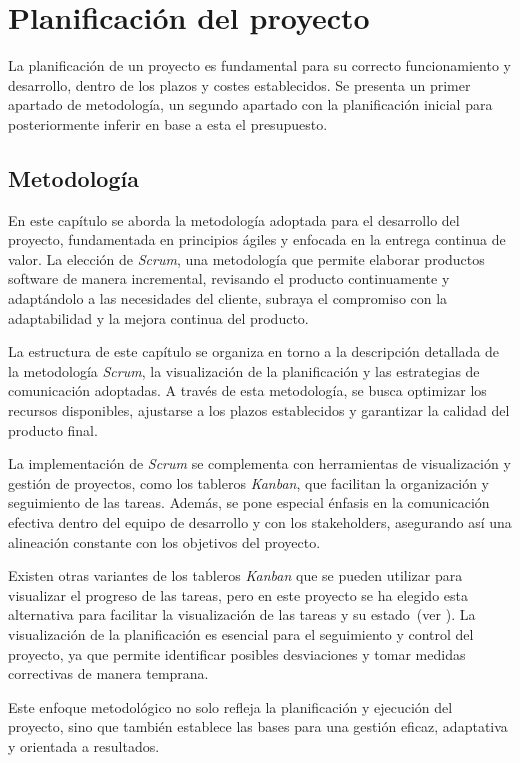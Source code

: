 \chapter{Planificación del proyecto}\label{chap:planif}
La planificación de un proyecto es fundamental para su correcto funcionamiento y
desarrollo, dentro de los plazos y costes establecidos. Se presenta un primer
apartado de metodología, un segundo apartado con la planificación inicial para
posteriormente inferir en base a esta el presupuesto.


\section{Metodología}\label{sec:metodología}
En este capítulo se aborda la metodología adoptada para el desarrollo del
proyecto, fundamentada en principios ágiles y enfocada en la entrega continua de
valor. La elección de \textit{Scrum}, una metodología que permite elaborar
productos software de manera incremental, revisando el producto continuamente y
adaptándolo a las necesidades del cliente, subraya el compromiso con la
adaptabilidad y la mejora continua del producto.

La estructura de este capítulo se organiza en torno a la descripción detallada
de la metodología \textit{Scrum}, la visualización de la planificación y las
estrategias de comunicación adoptadas. A través de esta metodología, se busca
optimizar los recursos disponibles, ajustarse a los plazos establecidos y
garantizar la calidad del producto final.

La implementación de \textit{Scrum} se complementa con herramientas de
visualización y gestión de proyectos, como los tableros \textit{Kanban}, que
facilitan la organización y seguimiento de las tareas. Además, se pone especial
énfasis en la comunicación efectiva dentro del equipo de desarrollo y con los
stakeholders, asegurando así una alineación constante con los objetivos del
proyecto.

Existen otras variantes de los tableros \textit{Kanban} que se pueden
utilizar para visualizar el progreso de las tareas, pero en este proyecto se ha
elegido esta alternativa para facilitar la visualización de las tareas y su
estado~(ver ). La visualización de la
planificación es esencial para el seguimiento y control del proyecto, ya que
permite identificar posibles desviaciones y tomar medidas correctivas de manera
temprana.

Este enfoque metodológico no solo refleja la planificación y ejecución del
proyecto, sino que también establece las bases para una gestión eficaz,
adaptativa y orientada a resultados.


